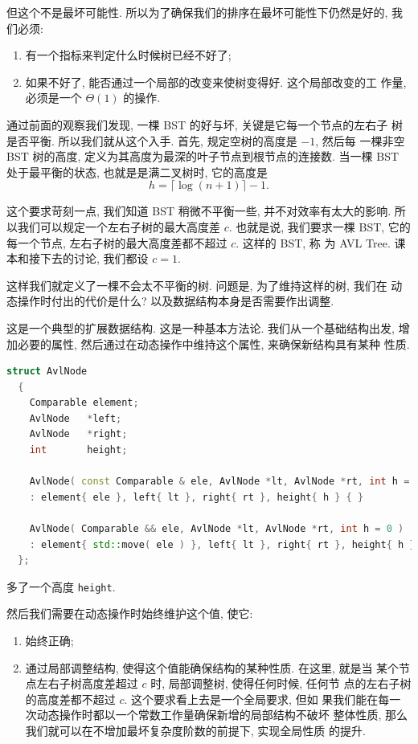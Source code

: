 \documentclass[a4paper]{ctexart}
\theoremstyle{definition}
\theoremstyle{definition}
\begin{document}
但这个不是最坏可能性. 所以为了确保我们的排序在最坏可能性下仍然是好的,
我们必须:

\begin{enumerate}
\item 有一个指标来判定什么时候树已经不好了;
\item 如果不好了, 能否通过一个局部的改变来使树变得好. 这个局部改变的工
  作量, 必须是一个 $\Theta(1)$ 的操作.
\end{enumerate}

通过前面的观察我们发现, 一棵 BST 的好与坏, 关键是它每一个节点的左右子
树是否平衡. 所以我们就从这个入手. 首先, 规定空树的高度是 $-1$, 然后每
一棵非空 BST 树的高度, 定义为其高度为最深的叶子节点到根节点的连接数.
当一棵 BST 处于最平衡的状态, 也就是是满二叉树时, 它的高度是
$$
h = \lceil \log (n + 1) \rceil - 1.
$$

这个要求苛刻一点, 我们知道 BST 稍微不平衡一些, 并不对效率有太大的影响.
所以我们可以规定一个左右子树的最大高度差 $c$. 也就是说, 我们要求一棵
BST, 它的每一个节点, 左右子树的最大高度差都不超过 $c$. 这样的 BST, 称
为 AVL Tree. 课本和接下去的讨论, 我们都设 $c = 1$.

这样我们就定义了一棵不会太不平衡的树. 问题是, 为了维持这样的树, 我们在
动态操作时付出的代价是什么? 以及数据结构本身是否需要作出调整.

这是一个典型的扩展数据结构. 这是一种基本方法论. 我们从一个基础结构出发,
增加必要的属性, 然后通过在动态操作中维持这个属性, 来确保新结构具有某种
性质.

\begin{lstlisting}[language=C++]
  struct AvlNode
  {
    Comparable element;
    AvlNode   *left;
    AvlNode   *right;
    int       height;

    AvlNode( const Comparable & ele, AvlNode *lt, AvlNode *rt, int h = 0 )
    : element{ ele }, left{ lt }, right{ rt }, height{ h } { }
    
    AvlNode( Comparable && ele, AvlNode *lt, AvlNode *rt, int h = 0 )
    : element{ std::move( ele ) }, left{ lt }, right{ rt }, height{ h } { }
  };
\end{lstlisting}

多了一个高度 \verb|height|. 

然后我们需要在动态操作时始终维护这个值, 使它:
\begin{enumerate}
\item 始终正确;
\item 通过局部调整结构, 使得这个值能确保结构的某种性质. 在这里, 就是当
  某个节点左右子树高度差超过 $c$ 时, 局部调整树, 使得任何时候, 任何节
  点的左右子树的高度差都不超过 $c$. 这个要求看上去是一个全局要求, 但如
  果我们能在每一次动态操作时都以一个常数工作量确保新增的局部结构不破坏
  整体性质, 那么我们就可以在不增加最坏复杂度阶数的前提下, 实现全局性质
  的提升. 
\end{enumerate}
\end{document}
